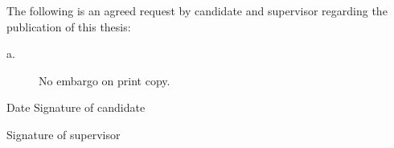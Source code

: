 The following is an agreed request by candidate and supervisor regarding the publication of this thesis:

\begin{description}
	\item[a.] No embargo on print copy.
\end{description}

\vspace{5mm}

Date \hspace{35mm} Signature of candidate

\vspace{10mm}

\hspace{43.5mm} Signature of supervisor